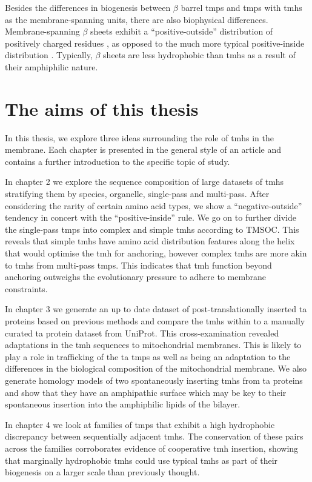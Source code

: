 Besides the differences in biogenesis between $\beta$ barrel \gls{tmp}s and \gls{tmp}s with \gls{tmh}s as the membrane\--spanning units, there are also biophysical differences.
Membrane\--spanning $\beta$ sheets exhibit a ``positive\--outside'' distribution of positively charged residues \cite{Pogozheva2013}, as opposed to the much more typical positive\--inside distribution \cite{VonHeijne1989, Andersson1992, Pogozheva2013, Sharpe2010, Baeza-Delgado2013}.
Typically, $\beta$ sheets are less hydrophobic than \gls{tmh}s \cite{Tamm2004} as a result of their amphiphilic nature.

\section{The aims of this thesis}

In this thesis, we explore three ideas surrounding the role of \gls{tmh}s in the membrane.
Each chapter is presented in the general style of an article and contains a further introduction to the specific topic of study.

In chapter 2 we explore the sequence composition of large datasets of \gls{tmh}s stratifying them by species, organelle, single\--pass and multi\--pass.
After considering the rarity of certain amino acid types, we show a ``negative\--outside'' tendency in concert with the ``positive\--inside'' rule.
We go on to further divide the single\--pass \gls{tmp}s into complex and simple \gls{tmh}s according to TMSOC.
This reveals that simple \gls{tmh}s have amino acid distribution features along the helix that would optimise the \gls{tmh} for anchoring, however complex \gls{tmh}s are more akin to \gls{tmh}s from multi\--pass \gls{tmp}s.
This indicates that \gls{tmh} function beyond anchoring outweighs the evolutionary pressure to adhere to membrane constraints.

In chapter 3 we generate an up to date dataset of post\--translationally inserted \gls{ta} proteins based on previous methods and compare the \gls{tmh}s within to a manually curated \gls{ta} protein dataset from UniProt.
This cross\--examination revealed adaptations in the \gls{tmh} sequences to mitochondrial membranes.
This is likely to play a role in trafficking of the \gls{ta} \gls{tmp}s as well as being an adaptation to the differences in the biological composition of the mitochondrial membrane.
We also generate homology models of two spontaneously inserting \gls{tmh}s from \gls{ta} proteins and show that they have an amphipathic surface which may be key to their spontaneous insertion into the amphiphilic lipids of the bilayer.

In chapter 4 we look at families of \gls{tmp}s that exhibit a high hydrophobic discrepancy between sequentially adjacent \gls{tmh}s.
The conservation of these pairs across the families corroborates evidence of cooperative \gls{tmh} insertion, showing that marginally hydrophobic \gls{tmh}s could use typical \gls{tmh}s as part of their biogenesis on a larger scale than previously thought.
